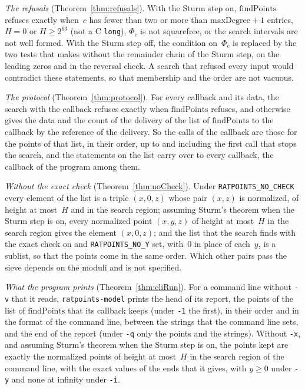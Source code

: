 \emph{The refusals} (Theorem~\ref{thm:refusals}). With the Sturm step on, $\mathrm{findPoints}$
refuses exactly when~$c$ has fewer than two or more than $\mathrm{maxDegree} + 1$ entries,
$H = 0$ or $H \ge 2^{63}$ (not a C \verb|long|), $\Phi_c$ is not squarefree, or the search
intervals are not well formed. With the Sturm step off, the condition on~$\Phi_c$ is replaced by the
two tests that \ratpoints{} makes without the remainder chain of the Sturm step, on the leading zeros
and in the reversal check. A search that refused every input would contradict these statements, so
that membership and the order are not vacuous.

\emph{The protocol} (Theorem~\ref{thm:protocol}). For every callback and its data, the search with
the callback refuses exactly when $\mathrm{findPoints}$ refuses, and otherwise gives the data and
the count of the delivery of the list of $\mathrm{findPoints}$ to the callback by the reference of
the delivery. So the calls of the callback are those for the points of that list, in their order,
up to and including the first call that stops the search, and the statements on the list carry over
to every callback, the callback of the program among them.

\emph{Without the exact check} (Theorem~\ref{thm:noCheck}). Under \verb|RATPOINTS_NO_CHECK| every
element of the list is a triple $(x, 0, z)$ whose pair $(x, z)$ is normalized, of height at
most~$H$ and in the search region; assuming Sturm's theorem when the Sturm step is on, every
normalized point $(x, y, z)$ of height at most~$H$ in the search region gives the element
$(x, 0, z)$; and the list that the search finds with the exact check on and \verb|RATPOINTS_NO_Y|
set, with~$0$ in place of each~$y$, is a sublist, so that the points come in the same order. Which
other pairs pass the sieve depends on the moduli and is not specified.

\emph{What the program prints} (Theorem~\ref{thm:cliRun}). For a command line without \verb|-v|
that it reads, \verb|ratpoints-model| prints the head of its report, the points of the list of
$\mathrm{findPoints}$ that its callback keeps (under \verb|-1| the first), in their order and in the
format of the command line, between the strings that the command line sets, and the end of the
report (under \verb|-q| only the points and the strings). Without \verb|-x|, and assuming Sturm's
theorem when the Sturm step is on, the points kept are exactly the normalized points of height at
most~$H$ in the search region of the command line, with the exact values of the ends that it gives,
with $y \ge 0$ under \verb|-y| and none at infinity under \verb|-i|.


